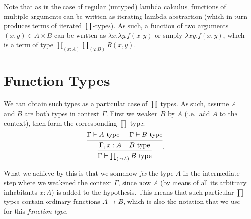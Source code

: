 Note that as in the case of regular (untyped) lambda calculus, functions of
multiple arguments can be written as iterating lambda abstraction
(which in turn produces terms of iterated $ \prod $-types). As such,
a function of two arguments $ (x, y) \in A \times B $ can be written as
$ \lambda x . \lambda y . f(x, y) $ or simply $ \lambda xy.f(x,y) $,
which is a term of type $ \prod_{(x : A)} \prod_{(y : B)} B(x, y) $.

\section{Function Types}
\label{sec:dep-fun}

\indent\indent We can obtain such types as a particular case of $ \prod $ types.
As such, assume $ A $ and $ B $ are both types in context $ \Gamma $.
First we weaken $ B $ by $ A $ (i.e.\ add $ A $ to the context), then
form the corresponding $ \prod $-type:
\[
  \begin{prooftree}
    \hypo{\Gamma \vdash A \text{ type}}
    \hypo{\Gamma \vdash B \text{ type}}
    \infer2{\Gamma, x : A \vdash B \text{ type}}
    \infer1{\Gamma \vdash \prod_{(x : A)} B \text{ type}}
  \end{prooftree}.
\]

What we achieve by this is that we somehow \emph{fix} the type $ A $
in the intermediate step where we weakened the context $ \Gamma $,
since now $ A $ (by means of all its arbitrary inhabitants $ x : A $)
is added to the hypothesis. This means that such particular $ \prod $
types contain ordinary functions $ A \to B $, which is also the
notation that we use for this \emph{function type}.

